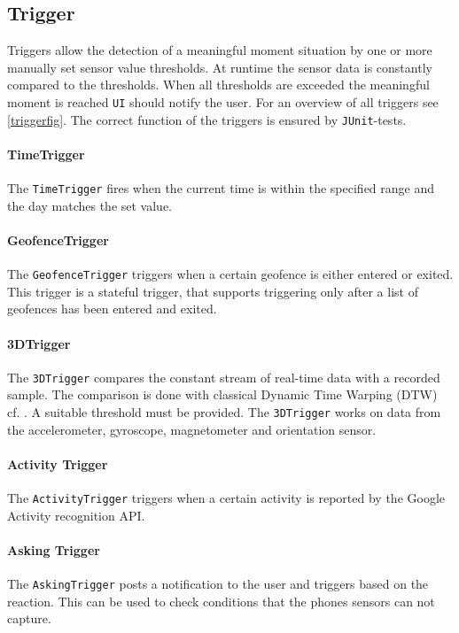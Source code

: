 \documentclass[a4paper]{report}
\begin{document}
\subsection{Trigger}\label{trigger}
Triggers allow the detection of a meaningful moment situation by one or more manually set sensor value thresholds. At runtime the sensor data is constantly compared to the thresholds. When all thresholds are exceeded the meaningful moment is reached \texttt{UI} should notify the user. For an overview of all triggers see \autoref{triggerfig}. The correct function of the triggers is ensured by \texttt{JUnit}-tests.
\paragraph{TimeTrigger} The \texttt{TimeTrigger} fires when the current time is within the specified range and the  day matches the set value.
\paragraph{GeofenceTrigger} The \texttt{GeofenceTrigger} triggers when a certain geofence is either entered or exited. This trigger is a stateful trigger, that supports triggering only after a list of geofences has been entered and exited.
\paragraph{3DTrigger} The \texttt{3DTrigger} compares the constant stream of real-time data with a recorded sample. The comparison is done with classical Dynamic Time Warping (DTW) cf. \cite{muller2007dynamic}. A suitable threshold must be provided. The \texttt{3DTrigger} works on data from the accelerometer, gyroscope, magnetometer and orientation sensor.
\paragraph{Activity Trigger} The \texttt{ActivityTrigger} triggers when a certain activity is reported by the Google Activity recognition API.
\paragraph{Asking Trigger} The \texttt{AskingTrigger} posts a notification to the user and triggers based on the reaction. This can be used to check conditions that the phones sensors can not capture.
\end{document}
